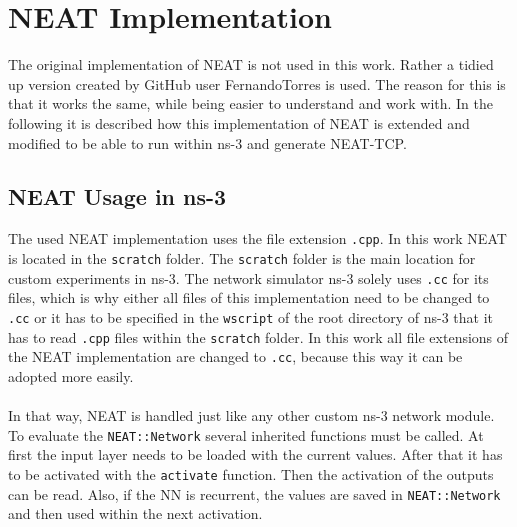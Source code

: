\section{NEAT Implementation}\label{sec:neatimpl}
The original implementation of NEAT is not used in this work. Rather a tidied up version \cite{neatimpl} created by GitHub user FernandoTorres is used. The reason for this is that it works the same, while being easier to understand and work with. In the following it is described how this implementation of NEAT is extended and modified to be able to run within ns-3 and generate NEAT-TCP.

\subsection{NEAT Usage in ns-3}\label{subsec:neatuse}
The used NEAT implementation uses the file extension \texttt{.cpp}. In this work NEAT is located in the \texttt{scratch} folder. The \texttt{scratch} folder is the main location for custom experiments in ns-3. The network simulator ns-3 solely uses \texttt{.cc} for its files, which is why either all files of this implementation need to be changed to \texttt{.cc} or it has to be specified in the \texttt{wscript} of the root directory of ns-3 that it has to read \texttt{.cpp} files within the \texttt{scratch} folder. In this work all file extensions of the NEAT implementation are changed to \texttt{.cc}, because this way it can be adopted more easily. \\\\
In that way, NEAT is handled just like any other custom ns-3 network module. \\
To evaluate the \texttt{NEAT::Network} several inherited functions must be called. At first the input layer needs to be loaded with the current values. After that it has to be activated with the \texttt{activate} function. Then the activation of the outputs can be read. Also, if the NN is recurrent, the values are saved in \texttt{NEAT::Network} and then used within the next activation.

